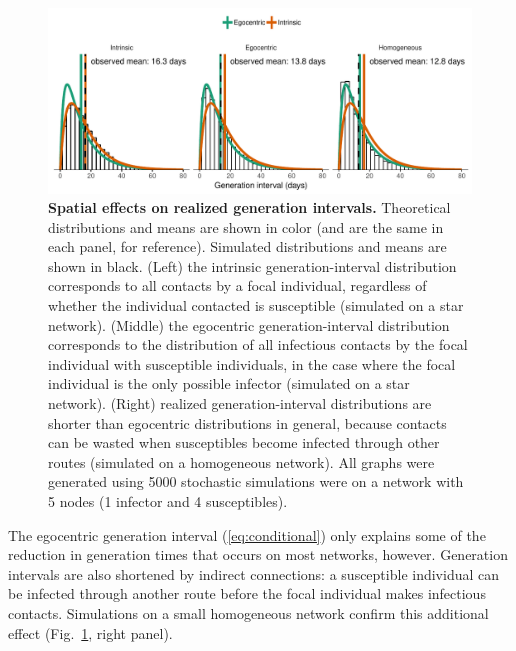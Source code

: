 \documentclass[12pt]{article}
\newcommand{\eref}[1]{(\ref{eq:#1})}
\newcommand{\fref}[1]{Fig.~\ref{fig:#1}}
\begin{document}
\begin{figure}
\includegraphics[width=\textwidth]{../fig/local_effect.pdf}
\caption{
\textbf{Spatial effects on realized generation intervals.}
Theoretical distributions and means are shown in color (and are the same in each panel, for reference). Simulated distributions and means are shown in black.
(Left) the intrinsic generation-interval distribution corresponds to all contacts by a focal individual, regardless of whether the individual contacted is susceptible (simulated on a star network).
(Middle) the egocentric generation-interval distribution corresponds to the distribution of all infectious contacts by the focal individual with susceptible individuals, in the case where the focal individual is the only possible infector (simulated on a star network).
(Right) realized generation-interval distributions are shorter than egocentric distributions in general, because contacts can be wasted when susceptibles become infected through other routes (simulated on a homogeneous network).
All graphs were generated using 5000 stochastic simulations were on a network with 5 nodes (1 infector and 4 susceptibles).
}
\label{fig:local}
\end{figure}

The egocentric generation interval \eref{conditional} only explains some of the reduction in generation times that occurs on most networks, however.
Generation intervals are also shortened by indirect connections: a susceptible individual can be infected through another route before the focal individual makes infectious contacts.
Simulations on a small homogeneous network confirm this additional effect (\fref{local}, right panel). 
\end{document}
